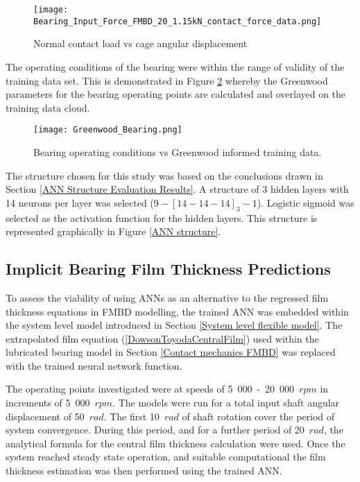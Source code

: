 \begin{figure}
	\centering
	\texttt{[image: Bearing\_Input\_Force\_FMBD\_20\_1.15kN\_contact\_force\_data.png]}
	\caption{Normal contact load vs cage angular displacement}
	\label{Contact Normal Load ANN}
\end{figure}

The operating conditions of the bearing were within the range of validity of the training data set. This is demonstrated in Figure \ref{Greenwood_Bearing} whereby the Greenwood parameters for the bearing operating points are calculated and overlayed on the training data cloud.

\begin{figure}
	\centering  
	\texttt{[image: Greenwood\_Bearing.png]}
	\caption{Bearing operating conditions vs Greenwood informed training data.}
	\label{Greenwood_Bearing}
\end{figure} 

The structure chosen for this study was based on the conclusions drawn in Section \ref{ANN Structure Evaluation Results}. A structure of 3 hidden layers with 14 neurons per layer was selected ($9-[14-14-14]_3-1$). Logistic sigmoid was selected as the activation function for the hidden layers. This structure is represented graphically in Figure \ref{ANN structure}.


\subsection{Implicit Bearing Film Thickness Predictions}

To assess the viability of using ANNs as an alternative to the regressed film thickness equations in FMBD modelling, the trained ANN was embedded within the system level model introduced in Section \ref{System level flexible model}. The extrapolated film equation (\ref{DowsonToyodaCentralFilm}) used within the lubricated bearing model in Section \ref{Contact mechanics FMBD} was replaced with the trained neural network function.

The operating points investigated were at speeds of 5~000~-~20~000~$rpm$ in increments of 5~000~$rpm$. The models were run for a total input shaft angular displacement of 50~$rad$. The first 10~$rad$ of shaft rotation cover the period of system convergence. During this period, and for a further period of 20~$rad$, the analytical formula for the central film thickness calculation were used. Once the system reached steady state operation, and suitable computational the film thickness estimation was then performed using the trained ANN. 

